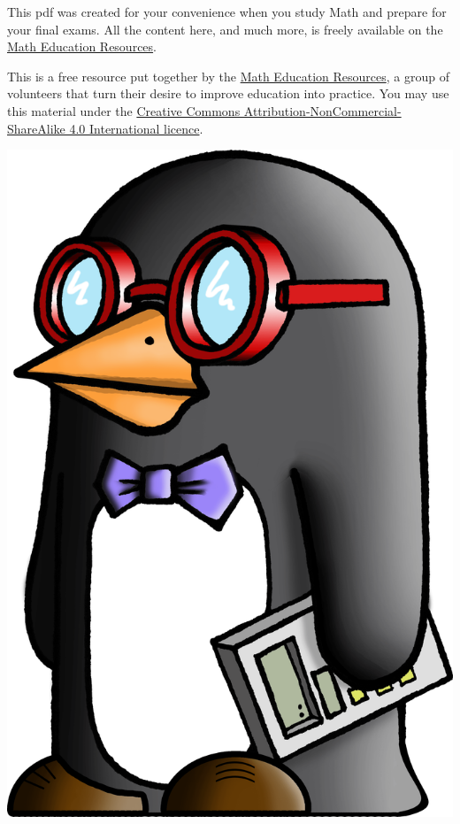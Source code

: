 {\small This pdf was created for your convenience when you study Math and prepare for your final exams. All the content here, and much more, is freely available on the \href{http://www.math-education-resources.com}{Math Education Resources}.}

\vfill

\begin{multicols}{2}
\hfill \begin{minipage}{0.45\textwidth}This is a free resource put together by the \href{http://www.math-education-resources.com}{Math Education Resources}, a group of volunteers that turn their desire to improve education into practice. You may use this material under the \href{https://creativecommons.org/licenses/by-nc-sa/4.0/}{Creative Commons Attribution-NonCommercial-ShareAlike 4.0 International licence}.

\end{minipage}

\columnbreak

\begin{center}
\includegraphics[width=.14\textwidth]{MERS_penguin_left_min.png}
\end{center}

\end{multicols}

\vfill
